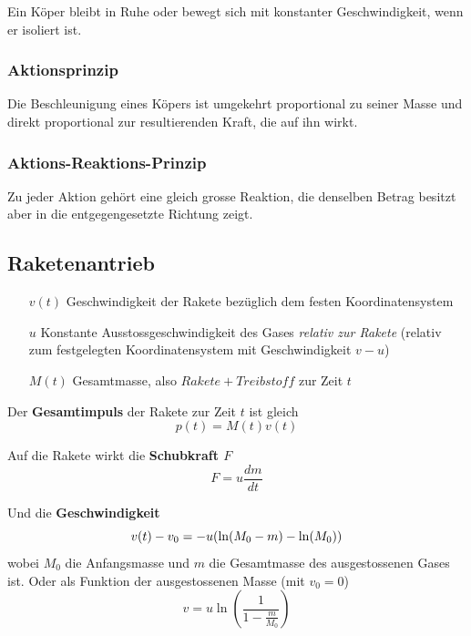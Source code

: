 \documentclass[7pt]{article}
\begin{document}
\begin{multicols*}{3}
Ein K{\"o}per bleibt in Ruhe oder bewegt sich mit konstanter Geschwindigkeit, wenn er isoliert ist.

\subsubsection{Aktionsprinzip}

Die Beschleunigung eines K{\"o}pers ist umgekehrt proportional zu seiner Masse und direkt proportional zur resultierenden Kraft, die auf ihn wirkt. 

\subsubsection{Aktions-Reaktions-Prinzip}

Zu jeder Aktion geh{\"o}rt eine gleich grosse Reaktion, die denselben Betrag besitzt aber in die entgegengesetzte Richtung zeigt.

\subsection{Raketenantrieb}

\begin{enumerate}
	\item [$v(t)$] Geschwindigkeit der Rakete bez{\"u}glich dem festen Koordinatensystem
	\item [$u$] Konstante Ausstossgeschwindigkeit des Gases \emph{relativ zur Rakete} (relativ zum festgelegten Koordinatensystem mit Geschwindigkeit $v-u$)
	\item [$M(t)$] Gesamtmasse, also $Rakete + Treibstoff$ zur Zeit $t$
\end{enumerate}

Der \textbf{Gesamtimpuls} der Rakete zur Zeit $t$ ist gleich
\begin{equation*}
	p(t) = M(t)v(t)
\end{equation*}

Auf die Rakete wirkt die \textbf{Schubkraft $F$}
\begin{equation*}
	F = u\frac{dm}{dt}
\end{equation*}

Und die \textbf{Geschwindigkeit}
\begin{equation*}
	v(t) - v_0 = -u(\ln(M_0 - m) - \ln(M_0))\\
\end{equation*}
wobei $M_0$ die Anfangsmasse und $m$ die Gesamtmasse des ausgestossenen Gases ist. \newline
Oder als Funktion der ausgestossenen Masse (mit $v_0 = 0$)
\begin{equation*}
	v = u\ln(\frac{1}{1-\frac{m}{M_0}})
\end{equation*}


\end{multicols*}
\end{document}
